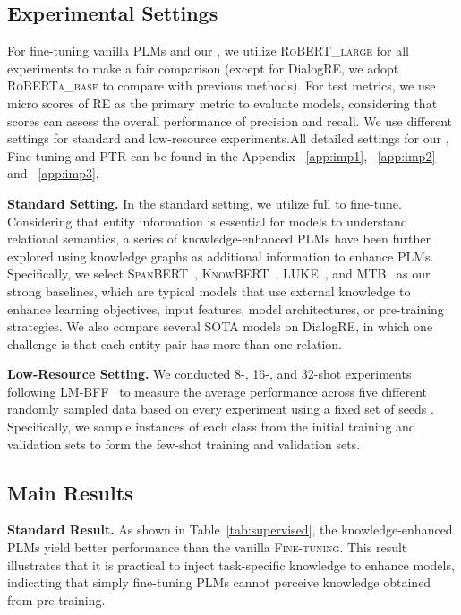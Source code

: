 \documentclass[sigconf]{acmart}
\begin{document}
\subsection{Experimental Settings}
For fine-tuning vanilla PLMs and our {\ours}, we utilize \textsc{RoBERT\_large} for all experiments to make a fair comparison (except for DialogRE, we adopt \textsc{RoBERTa\_base} to compare with previous methods). 
For test metrics, we use micro  scores of RE as the primary metric to evaluate models, considering that  scores can assess the overall performance of precision and recall. We use different settings for standard and low-resource experiments.All detailed settings for our {\ours}, Fine-tuning and PTR can be found in the Appendix ~\ref{app:imp1}, ~\ref{app:imp2} and ~\ref{app:imp3}.

 

 
\textbf{Standard Setting.}
In the standard setting, we utilize full  to fine-tune. 
Considering that entity information is essential for models to understand relational semantics, a series of knowledge-enhanced PLMs have been further explored using knowledge graphs as additional information to enhance PLMs. 
Specifically, we select \textsc{SpanBERT}~\cite{joshi2020spanbert}, \textsc{KnowBERT}~\cite{peters2019knowledge}, \textsc{LUKE}~\cite{yamada2020luke}, and \textsc{MTB}~\cite{baldini-soares-etal-2019-matching} as our strong baselines, which are typical models that use external knowledge to enhance learning objectives, input features, model architectures, or pre-training strategies. 
We also compare several SOTA models on DialogRE, in which one challenge is that each entity pair has more than one relation.

\textbf{Low-Resource Setting.}
We conducted 8-, 16-, and 32-shot experiments following LM-BFF~\cite{DBLP:journals/corr/abs-2012-15723,ptr} to measure the average performance across five different randomly sampled data based on every experiment using a fixed set of seeds . 
Specifically, we sample  instances of each class from the initial training and validation sets to form the few-shot training and validation sets.



 






\subsection{Main Results}


\textbf{Standard Result.}
As shown in Table~\ref{tab:supervised}, the knowledge-enhanced PLMs yield better performance than the vanilla \textsc{Fine-tuning}.
This result illustrates that it is practical to inject task-specific knowledge to enhance models, indicating that simply fine-tuning PLMs cannot perceive knowledge obtained from pre-training. 
\end{document}
